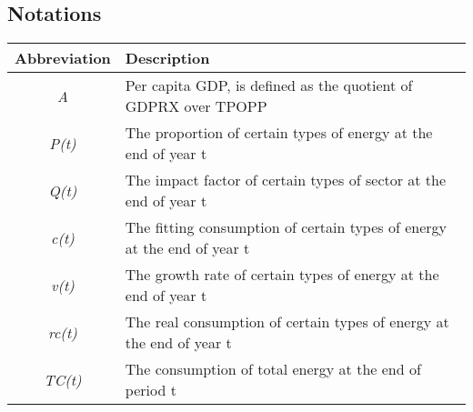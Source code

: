 \subsection{Notations}
\begin{table}[h]
	\centering
	\label{my-label}
	\begin{tabular}{@{}cl@{}}
		\toprule
		\multicolumn{1}{l}{Abbreviation} & Description                                                             \\ \midrule
		\textit{A}                       & Per capita GDP, is defined as the quotient of GDPRX over TPOPP          \\
		\textit{P(t)}                    & The proportion of certain types of energy at the end of year t          \\
		\textit{Q(t)}                    & The impact factor of certain types of sector at the end of year t       \\
		\textit{c(t)}                    & The fitting consumption of certain types of energy at the end of year t \\
		\textit{v(t)}                    & The growth rate of certain types of energy at the end of year t         \\
		\textit{rc(t)}                   & The real consumption of certain types of energy at the end of year t    \\
		\textit{TC(t)}                   & The consumption of total energy at the end of period t                  \\ \bottomrule
	\end{tabular}
\end{table}
